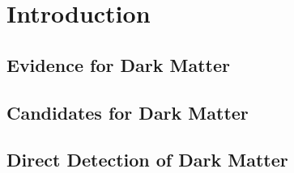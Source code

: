 \chapter{Introduction}
\section{Evidence for Dark Matter}

\section{Candidates for Dark Matter}

\section{Direct Detection of Dark Matter}